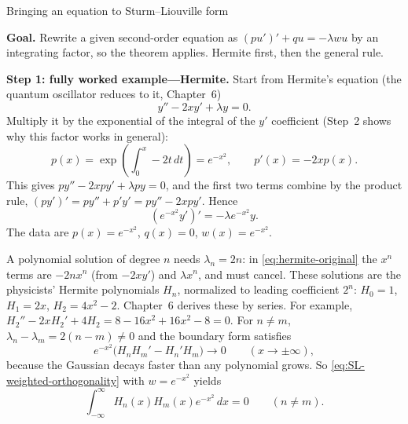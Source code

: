 \documentclass[11pt]{beamer}
\begin{document}
\begin{frame}[allowframebreaks=1.00]{Bringing an equation to Sturm--Liouville form}
\footnotesize

\textbf{Goal.} Rewrite a given second-order equation as $(pu')'+qu=-\lambda wu$ by an integrating
factor, so the theorem applies. Hermite first, then the general rule.

\textbf{Step 1: fully worked example---Hermite.}
Start from Hermite's equation (the quantum oscillator reduces to it, Chapter~6)
\begin{equation}
  y''-2xy'+\lambda y=0.
  \label{eq:hermite-original}
\end{equation}
Multiply it by the exponential of the integral of the $y'$ coefficient (Step~2
shows why this factor works in general):
\[
 p(x)=\exp\left(\int_0^x-2t\,dt\right)=e^{-x^2},
 \qquad p'(x)=-2xp(x).
\]
This gives $py''-2xpy'+\lambda py=0$, and the first two terms combine by the product rule,
$(py')'=py''+p'y'=py''-2xpy'$. Hence
\begin{equation}
 (e^{-x^2}y')'=-\lambda e^{-x^2}y.\label{eq:hermite-SL}
\end{equation}
The data are $p(x)=e^{-x^2}$, $q(x)=0$, $w(x)=e^{-x^2}$.
\par\framebreak\par
A polynomial solution of degree $n$ needs $\lambda_n=2n$: in \eqref{eq:hermite-original}
the $x^n$ terms are $-2nx^n$ (from $-2xy'$) and $\lambda x^n$, and must cancel.
These solutions are the physicists' Hermite polynomials $H_n$, normalized to
leading coefficient $2^n$: $H_0=1$, $H_1=2x$, $H_2=4x^2-2$.
Chapter~6 derives these by series. For example,
$H_2''-2xH_2'+4H_2=8-16x^2+16x^2-8=0$.
For $n\neq m$, $\lambda_n-\lambda_m=2(n-m)\neq0$ and the boundary form satisfies
\[
  e^{-x^2}\bigl(H_nH_m'-H_n'H_m\bigr)\longrightarrow0
  \qquad(x\to\pm\infty),
\]
because the Gaussian decays faster than any polynomial grows.  So
\eqref{eq:SL-weighted-orthogonality} with $w=e^{-x^2}$ yields
\begin{equation}
  \int_{-\infty}^{\infty}H_n(x)H_m(x)e^{-x^2}\,dx=0
  \qquad(n\neq m).
  \label{eq:hermite-orth}
\end{equation}


\end{frame}
\end{document}
